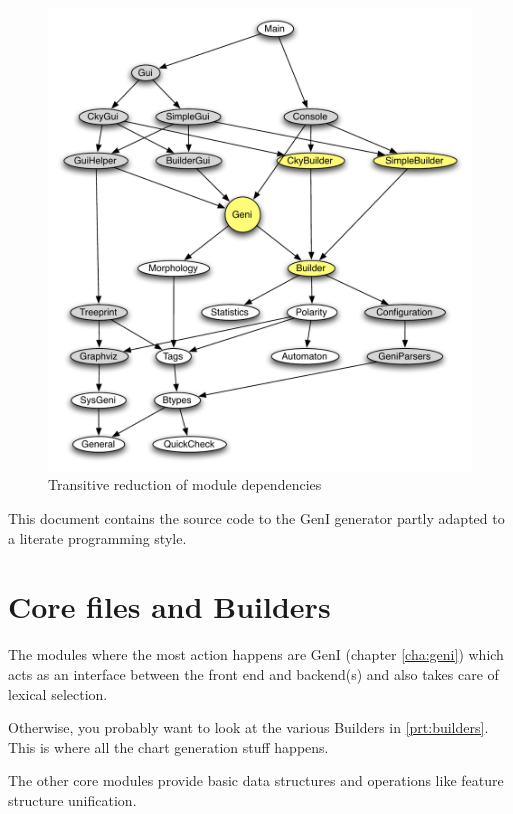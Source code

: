 \documentclass[a4paper,11pt]{report}
\begin{document}
\begin{figure}[h]
\begin{center}
\includegraphics[scale=0.5]{images/genidep}
\caption{Transitive reduction of module dependencies}
\end{center}
\end{figure}

This document contains the source code to the GenI generator 
partly adapted to a literate programming style.  

\section{Core files and Builders}

The modules where the most action happens are GenI (chapter
\ref{cha:geni}) which acts as an interface between the front end and
backend(s) and also takes care of lexical selection.

Otherwise, you probably want to look at the various Builders in
\ref{prt:builders}.  This is where all the chart generation stuff
happens.

The other core modules provide basic data structures and operations
like feature structure unification.
\end{document}
